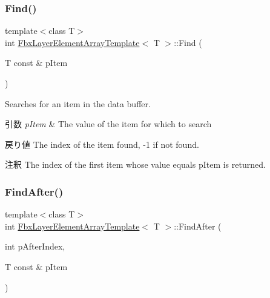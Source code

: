 \subsubsection{\texorpdfstring{Find()}{Find()}}
{\footnotesize\ttfamily template$<$class T$>$ \\
int \hyperlink{class_fbx_layer_element_array_template}{Fbx\+Layer\+Element\+Array\+Template}$<$ T $>$\+::Find (\begin{DoxyParamCaption}\item[{T const \&}]{p\+Item }\end{DoxyParamCaption})}

Searches for an item in the data buffer. 
\begin{DoxyParams}{引数}
{\em p\+Item} & The value of the item for which to search \\
\hline
\end{DoxyParams}
\begin{DoxyReturn}{戻り値}
The index of the item found, -\/1 if not found. 
\end{DoxyReturn}
\begin{DoxyRemark}{注釈}
The index of the first item whose value equals p\+Item is returned. 
\end{DoxyRemark}
\mbox{\label{class_fbx_layer_element_array_template_a76bad491c68ab608c7f07daf7e659bfe}} 
\subsubsection{\texorpdfstring{Find\+After()}{FindAfter()}}
{\footnotesize\ttfamily template$<$class T$>$ \\
int \hyperlink{class_fbx_layer_element_array_template}{Fbx\+Layer\+Element\+Array\+Template}$<$ T $>$\+::Find\+After (\begin{DoxyParamCaption}\item[{int}]{p\+After\+Index,  }\item[{T const \&}]{p\+Item }\end{DoxyParamCaption})}

